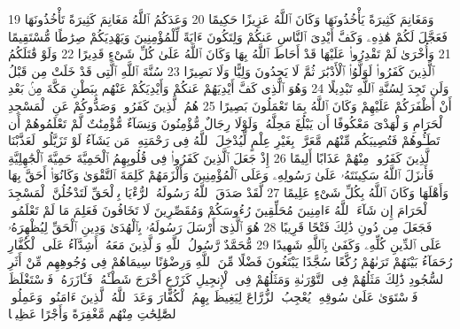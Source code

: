 {\tiny\colorbox{cl_aya}{19}} وَمَغَانِمَ كَثِيرَةً يَأْخُذُونَهَا وَكَانَ ٱللَّهُ عَزِيزًا حَكِيمًا
{\tiny\colorbox{cl_aya}{20}} وَعَدَكُمُ ٱللَّهُ مَغَانِمَ كَثِيرَةً تَأْخُذُونَهَا فَعَجَّلَ لَكُمْ هَٰذِهِۦ وَكَفَّ أَيْدِىَ ٱلنَّاسِ عَنكُمْ وَلِتَكُونَ ءَايَةً لِّلْمُؤْمِنِينَ وَيَهْدِيَكُمْ صِرَٰطًا مُّسْتَقِيمًا
{\tiny\colorbox{cl_aya}{21}} وَأُخْرَىٰ لَمْ تَقْدِرُوا۟ عَلَيْهَا قَدْ أَحَاطَ ٱللَّهُ بِهَا وَكَانَ ٱللَّهُ عَلَىٰ كُلِّ شَىْءٍ قَدِيرًا
{\tiny\colorbox{cl_aya}{22}} وَلَوْ قَٰتَلَكُمُ ٱلَّذِينَ كَفَرُوا۟ لَوَلَّوُا۟ ٱلْأَدْبَٰرَ ثُمَّ لَا يَجِدُونَ وَلِيًّا وَلَا نَصِيرًا
{\tiny\colorbox{cl_aya}{23}} سُنَّةَ ٱللَّهِ ٱلَّتِى قَدْ خَلَتْ مِن قَبْلُ وَلَن تَجِدَ لِسُنَّةِ ٱللَّهِ تَبْدِيلًا
{\tiny\colorbox{cl_aya}{24}} وَهُوَ ٱلَّذِى كَفَّ أَيْدِيَهُمْ عَنكُمْ وَأَيْدِيَكُمْ عَنْهُم بِبَطْنِ مَكَّةَ مِنۢ بَعْدِ أَنْ أَظْفَرَكُمْ عَلَيْهِمْ وَكَانَ ٱللَّهُ بِمَا تَعْمَلُونَ بَصِيرًا
{\tiny\colorbox{cl_aya}{25}} هُمُ ٱلَّذِينَ كَفَرُوا۟ وَصَدُّوكُمْ عَنِ ٱلْمَسْجِدِ ٱلْحَرَامِ وَٱلْهَدْىَ مَعْكُوفًا أَن يَبْلُغَ مَحِلَّهُۥ وَلَوْلَا رِجَالٌ مُّؤْمِنُونَ وَنِسَآءٌ مُّؤْمِنَٰتٌ لَّمْ تَعْلَمُوهُمْ أَن تَطَـُٔوهُمْ فَتُصِيبَكُم مِّنْهُم مَّعَرَّةٌۢ بِغَيْرِ عِلْمٍ لِّيُدْخِلَ ٱللَّهُ فِى رَحْمَتِهِۦ مَن يَشَآءُ لَوْ تَزَيَّلُوا۟ لَعَذَّبْنَا ٱلَّذِينَ كَفَرُوا۟ مِنْهُمْ عَذَابًا أَلِيمًا
{\tiny\colorbox{cl_aya}{26}} إِذْ جَعَلَ ٱلَّذِينَ كَفَرُوا۟ فِى قُلُوبِهِمُ ٱلْحَمِيَّةَ حَمِيَّةَ ٱلْجَٰهِلِيَّةِ فَأَنزَلَ ٱللَّهُ سَكِينَتَهُۥ عَلَىٰ رَسُولِهِۦ وَعَلَى ٱلْمُؤْمِنِينَ وَأَلْزَمَهُمْ كَلِمَةَ ٱلتَّقْوَىٰ وَكَانُوٓا۟ أَحَقَّ بِهَا وَأَهْلَهَا وَكَانَ ٱللَّهُ بِكُلِّ شَىْءٍ عَلِيمًا
{\tiny\colorbox{cl_aya}{27}} لَّقَدْ صَدَقَ ٱللَّهُ رَسُولَهُ ٱلرُّءْيَا بِٱلْحَقِّ لَتَدْخُلُنَّ ٱلْمَسْجِدَ ٱلْحَرَامَ إِن شَآءَ ٱللَّهُ ءَامِنِينَ مُحَلِّقِينَ رُءُوسَكُمْ وَمُقَصِّرِينَ لَا تَخَافُونَ فَعَلِمَ مَا لَمْ تَعْلَمُوا۟ فَجَعَلَ مِن دُونِ ذَٰلِكَ فَتْحًا قَرِيبًا
{\tiny\colorbox{cl_aya}{28}} هُوَ ٱلَّذِىٓ أَرْسَلَ رَسُولَهُۥ بِٱلْهُدَىٰ وَدِينِ ٱلْحَقِّ لِيُظْهِرَهُۥ عَلَى ٱلدِّينِ كُلِّهِۦ وَكَفَىٰ بِٱللَّهِ شَهِيدًا
{\tiny\colorbox{cl_aya}{29}} مُّحَمَّدٌ رَّسُولُ ٱللَّهِ وَٱلَّذِينَ مَعَهُۥٓ أَشِدَّآءُ عَلَى ٱلْكُفَّارِ رُحَمَآءُ بَيْنَهُمْ تَرَىٰهُمْ رُكَّعًا سُجَّدًا يَبْتَغُونَ فَضْلًا مِّنَ ٱللَّهِ وَرِضْوَٰنًا سِيمَاهُمْ فِى وُجُوهِهِم مِّنْ أَثَرِ ٱلسُّجُودِ ذَٰلِكَ مَثَلُهُمْ فِى ٱلتَّوْرَىٰةِ وَمَثَلُهُمْ فِى ٱلْإِنجِيلِ كَزَرْعٍ أَخْرَجَ شَطْـَٔهُۥ فَـَٔازَرَهُۥ فَٱسْتَغْلَظَ فَٱسْتَوَىٰ عَلَىٰ سُوقِهِۦ يُعْجِبُ ٱلزُّرَّاعَ لِيَغِيظَ بِهِمُ ٱلْكُفَّارَ وَعَدَ ٱللَّهُ ٱلَّذِينَ ءَامَنُوا۟ وَعَمِلُوا۟ ٱلصَّٰلِحَٰتِ مِنْهُم مَّغْفِرَةً وَأَجْرًا عَظِيمًۢا
